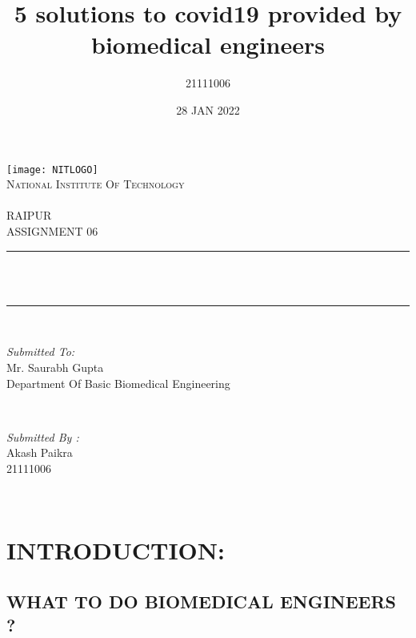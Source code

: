 \documentclass[12pt]{article}
\title{5 solutions to covid19 provided by biomedical engineers }\newline \\\\
\author{21111006}
\date{28 JAN 2022}
\makeatletter
\let\thetitle\@title
\makeatother
\begin{document}
\begin{titlepage}
	\centering
    \texttt{[image: NITLOGO]}\\[1.0 cm]	
    \textsc{\LARGE National Institute Of Technology \newline\\\\ RAIPUR}\\[2.0 CM]
    
	\textsc{\Large ASSIGNMENT 06}\\[0.5 cm]				%
	\rule{\linewidth}{0.4 mm} \\[0.4 cm]
	{ \huge \bfseries \thetitle}\\
	\rule{\linewidth}{0.4 mm} \\[1.5 cm]
	
	\begin{minipage}{0.6\textwidth}
		\begin{flushleft} \large
			\emph{Submitted To:}\\
			Mr. Saurabh Gupta\\
            Department Of Basic Biomedical Engineering\\
			\end{flushleft}
			\end{minipage}~
			\begin{minipage}{0.4\textwidth}
            
			\begin{flushright} \large
			\emph{Submitted By :}\\
			Akash Paikra\\
            21111006\\
		\end{flushright}
        
	\end{minipage}\\[2 cm]
\end{titlepage}

\tableofcontents
\pagebreak







\section{INTRODUCTION:}


\subsection{WHAT TO DO BIOMEDICAL ENGINEERS ?}
\end{document}
